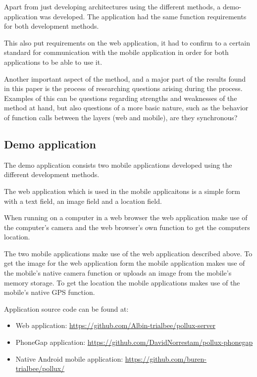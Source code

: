 Apart from just developing architectures using the different methods, a demo-application was developed. The application had the same function requirements for both development methods.

This also put requirements on the web application, it had to confirm to a certain standard for communication with the mobile application in order for both applications to be able to use it. 

Another important aspect of the method, and a major part of the results found in this paper is the process of researching questions arising during the process. Examples of this can be questions regarding strengths and weaknesses of the method at hand, but also questions of a more basic nature, such as the behavior of function calls between the layers (web and mobile), are they synchronous?

\subsection{Demo application}
The demo application consists two mobile applications developed using the different development methods. 

The web application which is used in the mobile applicaitons is a simple form with a text field, an image field and a location field.

When running on a computer in a web browser the web application make use of the computer's camera and the web browser's own function to get the computers location.

The two mobile applications make use of the web application described above. To get the image for the web application form the mobile application makes use of the mobile's native camera function or uploads an image from the mobile's memory storage. To get the location the mobile applications makes use of the mobile's native GPS function. 

Application source code can be found at:
\begin{itemize}
  \item Web application: \url{https://github.com/Albin-trialbee/pollux-server}
  \item PhoneGap application: \url{https://github.com/DavidNorrestam/pollux-phonegap}
  \item Native Android mobile application: \url{https://github.com/buren-trialbee/pollux/}
\end{itemize}